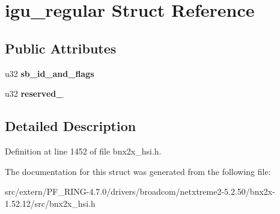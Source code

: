 \hypertarget{structigu__regular}{
\section{igu\_\-regular Struct Reference}
\label{structigu__regular}
}
\subsection*{Public Attributes}
\begin{DoxyCompactItemize}
\item 
\hypertarget{structigu__regular_a54250292882be85219d2bb7efde097f3}{
u32 {\bfseries sb\_\-id\_\-and\_\-flags}}
\label{structigu__regular_a54250292882be85219d2bb7efde097f3}

\item 
\hypertarget{structigu__regular_a40cc03d16a1d24c9a7efbee95dc331a5}{
u32 {\bfseries reserved\_}}
\label{structigu__regular_a40cc03d16a1d24c9a7efbee95dc331a5}

\end{DoxyCompactItemize}


\subsection{Detailed Description}


Definition at line 1452 of file bnx2x\_\-hsi.h.



The documentation for this struct was generated from the following file:\begin{DoxyCompactItemize}
\item 
src/extern/PF\_\-RING-\/4.7.0/drivers/broadcom/netxtreme2-\/5.2.50/bnx2x-\/1.52.12/src/bnx2x\_\-hsi.h\end{DoxyCompactItemize}
